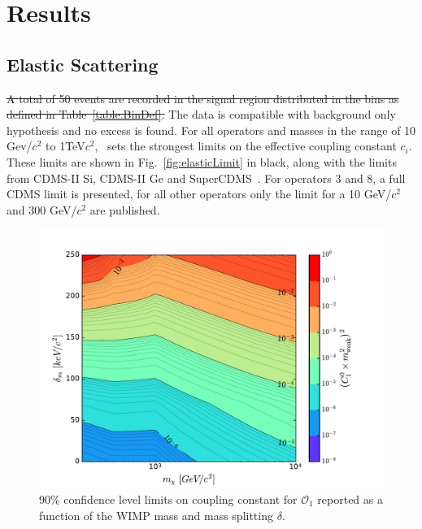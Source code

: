 \section{Results}
\subsection{Elastic Scattering}
\sout{A total of 50 events are recorded in the signal region distributed in the bins as defined in Table~\ref{table:BinDef}.} The data is compatible with background only hypothesis and no excess is found. For all operators and masses in the range of 10 Gev/$c^2$ to 1TeV$c^2$, \Xehund\ sets the strongest limits on the effective coupling constant $c_i$. These limits are shown in Fig.~\ref{fig:elasticLimit} in black, along with the limits from CDMS-II Si, CDMS-II Ge and SuperCDMS~\cite{CDMSEFT}. For operators 3 and 8, a full CDMS limit is presented, for all other operators only the limit for a 10 GeV/$c^2$ and 300 GeV/$c^2$ are published.  

\begin{figure}[h!]
\centerline{\includegraphics[width=1.\linewidth]{Figures/O1_inelastic_lim_2D}}
\caption{90\% confidence level limits on coupling constant for $\mathcal{O}_1$ reported as a function of the WIMP mass and mass splitting $\delta$.}
\label{fig:O1Inel}
\end{figure}  

